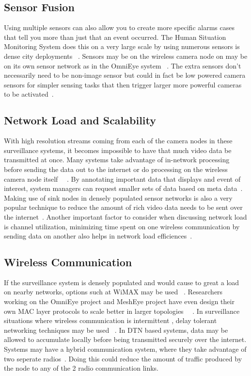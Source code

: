 \documentclass[journal,transmag]{IEEEtran}
\begin{document}
\subsection{Sensor Fusion}
Using multiple sensors can also allow you to create more specific alarms cases that tell you more than just that an event occurred. The Human Situation
Monitoring System does this on a very large scale by using numerous sensors is dense city deployments ~\cite{HuSIMS}. Sensors may be on the wireless camera
node on may be on its own sensor network as in the OmniEye system ~\cite{OmniEye}. The extra sensors don't necessarily need to be non-image sensor but 
could in fact be low powered camera sensors for simpler sensing tasks that then trigger larger more powerful cameras to be activated~\cite{SensEye}.

\subsection{Network Load and Scalability}
With high resolution streams coming from each of the camera nodes in these surveillance systems, it becomes impossible to have 
that much video data be transmitted at once. Many systems take advantage of in-network processing before sending the data out to the internet or do processing on
the wireless camera node itself ~\cite{HuSIMS}~\cite{OmniEye}. By annotating important data that displays and event of interest, system managers can request smaller sets 
of data based on meta data~\cite{OmniEye}. Making use of sink nodes in densely populated sensor networks is also a very popular technique to reduce the 
amount of rich video data needs to be sent over the internet~\cite{HuSIMS}. Another important factor to consider when discussing network load is channel utilization,
minimizing time spent on one wireless communication by sending data on another also helps in network load efficiences~\cite{Flexi-WVSNP}.


\subsection{Wireless Communication}
If the surveillance system is densely populated and would cause to great a load on nearby networks, options such at WiMAX may be used ~\cite{HuSIMS}. 
Researchers working on the OmniEye project and MeshEye project have even design their own MAC layer protocols to scale better in larger topologies ~\cite{MeshEye}~\cite{OmniEye}. In surveillance 
situations where wireless communication is intermittent , delay tolerant networking techniques may be used ~\cite{DTNSmartCamera}. In DTN based systems, data
may be allowed to accumulate locally before being transmitted securely over the internet. Systems may have a hybrid communication system, where they take advantage of
two seperate radios~\cite{Flexi-WVSNP}. Doing this could reduce the amount of traffic produced by the node to any of the 2 radio communication links.
\end{document}
